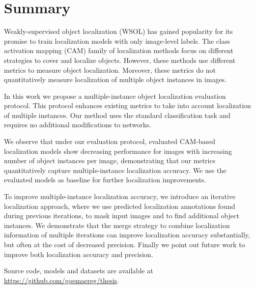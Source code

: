 \chapter*{Summary}

Weakly-supervised object localization (WSOL) has gained popularity for its promise to train localization models with only image-level labels. The class activation mapping (CAM) family of localization methods focus on different strategies to cover and localize objects. However, these methods use different metrics to measure object localization. Moreover, these metrics do not quantitatively measure localization of multiple object instances in images.

In this work we propose a multiple-instance object localization evaluation protocol. This protocol enhances existing metrics to take into account localization of multiple instances. Our method uses the standard classification task and requires no additional modifications to networks.

We observe that under our evaluation protocol, evaluated CAM-based localization models show decreasing performance for images with increasing number of object instances per image, demonstrating that our metrics quantitatively capture multiple-instance localization accuracy. We use the evaluated models as baseline for further localization improvements.

To improve multiple-instance localization accuracy, we introduce an iterative localization approach, where we use predicted localization annotations found during previous iterations, to mask input images and to find additional object instances. We demonstrate that the merge strategy to combine localization information of multiple iterations can improve localization accuracy substantially, but often at the cost of decreased precision. Finally we point out future work to improve both localization accuracy and precision.

Source code, models and datasets are available at \url{https://github.com/goemaereg/thesis}.